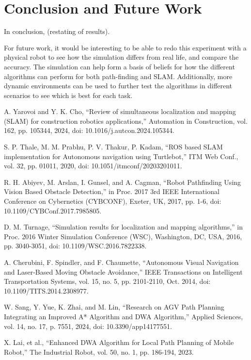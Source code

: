 \documentclass{article}
\begin{document}
\section{Conclusion and Future Work}

In conclusion, (restating of results). 

For future work, it would be interesting to be able to redo this experiment with a physical robot to see how the simulation differs from real life, and compare the accuracy. The simulation can help form a basis of beliefs for how the different algorithms can perform for both path-finding and SLAM. Additionally, more dynamic environments can be used to further test the algorithms in different scenarios to see which is best for each task. 


\begin{thebibliography}{9}


A. Yarovoi and Y. K. Cho, ``Review of simultaneous localization and mapping (SLAM) for construction robotics applications,'' Automation in Construction, vol. 162, pp. 105344, 2024, doi: 10.1016/j.autcon.2024.105344.

S. P. Thale, M. M. Prabhu, P. V. Thakur, P. Kadam, ``ROS based SLAM implementation for Autonomous navigation using Turtlebot,'' ITM Web Conf., vol. 32, pp. 01011, 2020, doi: 10.1051/itmconf/20203201011.

R. H. Abiyev, M. Arslan, I. Gunsel, and A. Cagman, ``Robot Pathfinding Using Vision Based Obstacle Detection,'' in Proc. 2017 3rd IEEE International Conference on Cybernetics (CYBCONF), Exeter, UK, 2017, pp. 1-6, doi: 10.1109/CYBConf.2017.7985805.

D. M. Turnage, ``Simulation results for localization and mapping algorithms,'' in Proc. 2016 Winter Simulation Conference (WSC), Washington, DC, USA, 2016, pp. 3040-3051, doi: 10.1109/WSC.2016.7822338.

A. Cherubini, F. Spindler, and F. Chaumette, ``Autonomous Visual Navigation and Laser-Based Moving Obstacle Avoidance,'' IEEE Transactions on Intelligent Transportation Systems, vol. 15, no. 5, pp. 2101-2110, Oct. 2014, doi: 10.1109/TITS.2014.2308977.

W. Sang, Y. Yue, K. Zhai, and M. Lin,  ``Research on AGV Path Planning Integrating an Improved A* Algorithm and DWA Algorithm,'' Applied Sciences, vol. 14, no. 17, p. 7551, 2024, doi: 10.3390/app14177551.

X. Lai, et al., ``Enhanced DWA Algorithm for Local Path Planning of Mobile Robot,'' The Industrial Robot, vol. 50, no. 1, pp. 186-194, 2023. 


\end{thebibliography}
\end{document}
